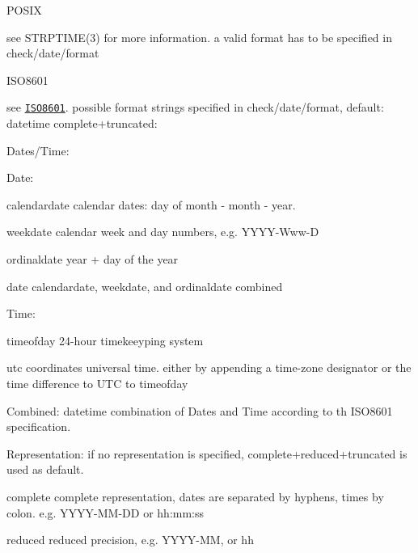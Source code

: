 \begin{DoxyItemize}
\item {\ttfamily P\+O\+S\+IX}

see {\ttfamily S\+T\+R\+P\+T\+I\+M\+E(3)} for more information. a valid format has to be specified in {\ttfamily check/date/format}
\item {\ttfamily I\+S\+O8601}

see \href{https://en.wikipedia.org/wiki/ISO_8601}{\tt I\+S\+O8601}. possible format strings specified in {\ttfamily check/date/format}, default\+: {\ttfamily datetime complete+truncated}\+:
\begin{DoxyItemize}
\item Dates/\+Time\+:
\begin{DoxyItemize}
\item Date\+:
\begin{DoxyItemize}
\item {\ttfamily calendardate} calendar dates\+: day of month -\/ month -\/ year.
\item {\ttfamily weekdate} calendar week and day numbers, e.\+g. Y\+Y\+Y\+Y-\/\+Www-\/D
\item {\ttfamily ordinaldate} year + day of the year
\item {\ttfamily date} {\ttfamily calendardate}, {\ttfamily weekdate}, and {\ttfamily ordinaldate} combined
\end{DoxyItemize}
\item Time\+:
\begin{DoxyItemize}
\item {\ttfamily timeofday} 24-\/hour timekeeyping system
\item {\ttfamily utc} coordinates universal time. either by appending a time-\/zone designator or the time difference to {\ttfamily U\+TC} to {\ttfamily timeofday}
\end{DoxyItemize}
\item Combined\+: {\ttfamily datetime} combination of Dates and Time according to th I\+S\+O8601 specification.
\end{DoxyItemize}
\item Representation\+: if no representation is specified, {\ttfamily complete+reduced+truncated} is used as default.
\begin{DoxyItemize}
\item {\ttfamily complete} complete representation, dates are separated by hyphens, times by colon. e.\+g. Y\+Y\+Y\+Y-\/\+M\+M-\/\+DD or hh\+:mm\+:ss
\item {\ttfamily reduced} reduced precision, e.\+g. Y\+Y\+Y\+Y-\/\+MM, or hh

\end{DoxyItemize}
\end{DoxyItemize}
\end{DoxyItemize}
